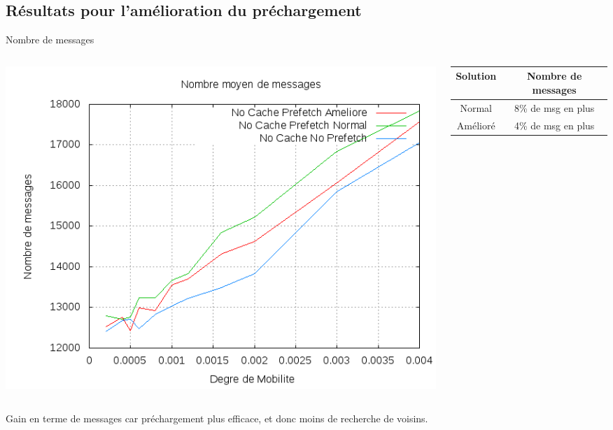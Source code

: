 \documentclass{beamer}
\begin{document}
  \subsection{Résultats pour l'amélioration du préchargement}
  \begin{frame}
	\begin{center}
	Nombre de messages 
	\end{center}
	\begin{columns}
         \begin{column}{5cm}
          \includegraphics[scale=0.25]{./Ressources/Images/Courbes_Final_Rapport/Nombre_Messages_Prefetchs.png}\\
         \end{column}
         \begin{column}{5cm}
		\begin{table}[!h]
                \begin{center}
                \begin{tabular}{|c|c|}
                \hline
                Solution & Nombre de messages \\
                \hline
                Normal &  8\% de msg en plus\\
                Amélioré &  4\% de msg en plus\\
                \hline
                \end{tabular}
                \end{center}
        \end{table}
         \end{column}
        \end{columns}
	\begin{itemize}\footnotesize{
		\item Gain en terme de messages car préchargement plus efficace, et donc moins de recherche de voisins.
		}
	\end{itemize}
  \end{frame}
	
\end{document}
